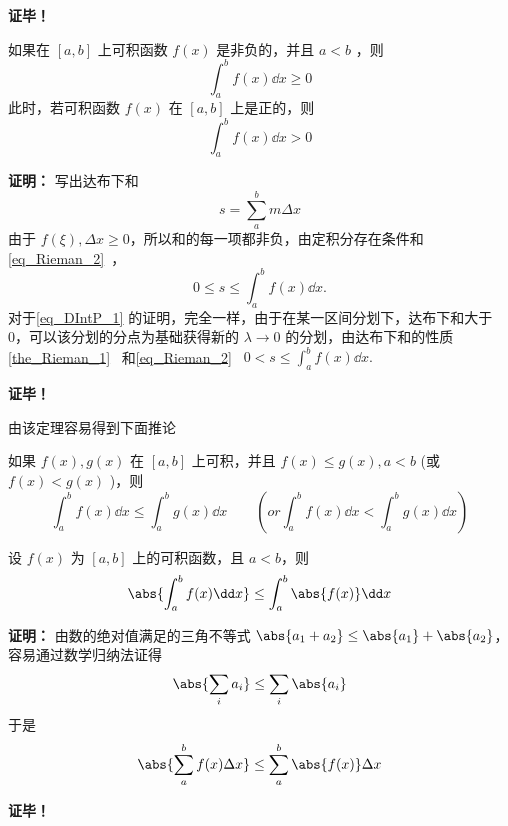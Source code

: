 \textbf{证毕！} 

\begin{theorem}{}
如果在 $[a,b]$ 上可积函数 $f(x)$ 是非负的，并且 $a<b$ ，则
\begin{equation}
\int_a^b f(x)\dd x\geq0
\end{equation}
此时，若可积函数 $f(x)$ 在 $[a,b]$ 上是正的，则
\begin{equation}\label{eq_DIntP_1}
\int_a^b f(x)\dd x>0
\end{equation}
\end{theorem}
\textbf{证明：}
写出达布下和
\begin{equation}
s=\sum_{a}^bm\Delta x
\end{equation}
由于 $f(\xi),\Delta x\geq0$，所以和的每一项都非负，由定积分存在条件和\autoref{eq_Rieman_2}~，
\begin{equation}
0\leq s\leq\int_a^b f(x)\dd x.
\end{equation}
对于\autoref{eq_DIntP_1} 的证明，完全一样，由于在某一区间分划下，达布下和大于0，可以该分划的分点为基础获得新的 $\lambda\rightarrow0$ 的分划，由达布下和的性质\autoref{the_Rieman_1}~ 和\autoref{eq_Rieman_2}~ 
$0<s\leq\int_a^b f(x)\dd x.$

\textbf{证毕！}

由该定理容易得到下面推论
\begin{corollary}{}
如果 $f(x),g(x)$ 在 $[a,b]$ 上可积，并且 $f(x)\leq g(x),a<b$ (或 $f(x)< g(x)$ )，则
\begin{equation}
\int_a^b f(x)\dd x\leq\int_a^b g(x)\dd x\qquad (or \int_a^b f(x)\dd x<\int_a^b g(x)\dd x)
\end{equation}

\end{corollary}
\begin{theorem}{}
设 $f(x)$ 为 $[a,b]$ 上的可积函数，且 $a<b$，则
\begin{equation}
\abs{\int_a^b f(x)\dd x}\leq\int_a^b \abs{f(x)}\dd x
\end{equation}
\end{theorem}
\textbf{证明：}
由数的绝对值满足的三角不等式 $\abs{a_1+a_2}\leq\abs{a_1}+\abs{a_2}$，容易通过数学归纳法证得
\begin{equation}
\abs{\sum_i a_i}\leq\sum_i \abs{a_i}
\end{equation}
于是
\begin{equation}
\abs{\sum_a^b f(x)\Delta x}\leq\sum_a^b\abs{f(x)}\Delta x
\end{equation}


\textbf{证毕！}